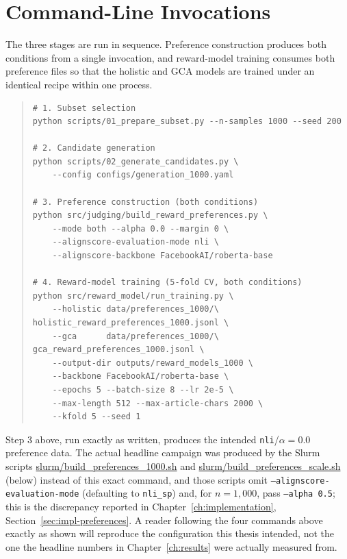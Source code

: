 \section{Command-Line Invocations}
\label{app:repro-commands}

The three stages are run in sequence. Preference construction produces both
conditions from a single invocation, and reward-model training consumes both
preference files so that the holistic and GCA models are trained under an
identical recipe within one process.

\begin{quote}
\footnotesize
\begin{verbatim}
# 1. Subset selection
python scripts/01_prepare_subset.py --n-samples 1000 --seed 200

# 2. Candidate generation
python scripts/02_generate_candidates.py \
    --config configs/generation_1000.yaml

# 3. Preference construction (both conditions)
python src/judging/build_reward_preferences.py \
    --mode both --alpha 0.0 --margin 0 \
    --alignscore-evaluation-mode nli \
    --alignscore-backbone FacebookAI/roberta-base

# 4. Reward-model training (5-fold CV, both conditions)
python src/reward_model/run_training.py \
    --holistic data/preferences_1000/\
holistic_reward_preferences_1000.jsonl \
    --gca      data/preferences_1000/\
gca_reward_preferences_1000.jsonl \
    --output-dir outputs/reward_models_1000 \
    --backbone FacebookAI/roberta-base \
    --epochs 5 --batch-size 8 --lr 2e-5 \
    --max-length 512 --max-article-chars 2000 \
    --kfold 5 --seed 1
\end{verbatim}
\end{quote}

\noindent
Step 3 above, run exactly as written, produces the intended
\texttt{nli}/$\alpha=0.0$ preference data. The actual headline campaign
was produced by the Slurm scripts \url{slurm/build_preferences_1000.sh}
and \url{slurm/build_preferences_scale.sh} (below) instead of this exact
command, and those scripts omit \texttt{--alignscore-evaluation-mode}
(defaulting to \texttt{nli\_sp}) and, for $n=1{,}000$, pass
\texttt{--alpha 0.5}; this is the discrepancy reported in
Chapter~\ref{ch:implementation}, Section~\ref{sec:impl-preferences}. A
reader following the four commands above exactly as shown will reproduce
the configuration this thesis intended, not the one the headline numbers
in Chapter~\ref{ch:results} were actually measured from.

